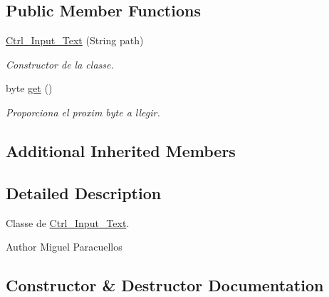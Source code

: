 \subsection*{Public Member Functions}
\begin{DoxyCompactItemize}
\item 
\hyperlink{classpersistencia_1_1input_1_1Ctrl__Input__Text_a945833e6bb2bb3fbdb328ae01392410f}{Ctrl\+\_\+\+Input\+\_\+\+Text} (String path)
\begin{DoxyCompactList}\small\item\em Constructor de la classe. \end{DoxyCompactList}\item 
byte \hyperlink{classpersistencia_1_1input_1_1Ctrl__Input__Text_a8b501ae723f8c6f8d63305a56e9720c3}{get} ()
\begin{DoxyCompactList}\small\item\em Proporciona el proxim byte a llegir. \end{DoxyCompactList}\end{DoxyCompactItemize}
\subsection*{Additional Inherited Members}


\subsection{Detailed Description}
Classe de \hyperlink{classpersistencia_1_1input_1_1Ctrl__Input__Text}{Ctrl\+\_\+\+Input\+\_\+\+Text}. 

\begin{DoxyAuthor}{Author}
Miguel Paracuellos 
\end{DoxyAuthor}


\subsection{Constructor \& Destructor Documentation}
\mbox{\label{classpersistencia_1_1input_1_1Ctrl__Input__Text_a945833e6bb2bb3fbdb328ae01392410f}} 
